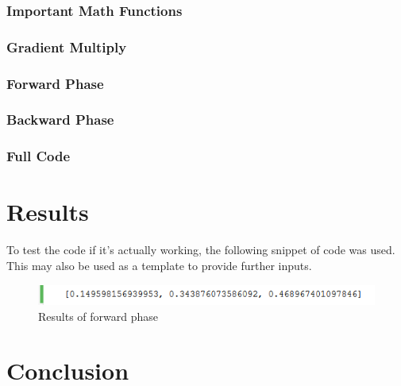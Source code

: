 \documentclass[a4paper, 11pt, english]{article}
\begin{document}
\subsubsection{Important Math Functions}

\subsubsection{Gradient Multiply} %

\subsubsection{Forward Phase}

\subsubsection{Backward Phase}

\subsubsection{Full Code}


\section{Results}
\par To test the code if it's actually working, the following snippet of code was used. This may also be used as a template to provide further inputs.

\begin{figure}[H]
  \centering
  \includegraphics[width=12cm]{images/result1.png}
  \caption{Results of forward phase} %
  \label{fig:result1}
\end{figure}

\section{Conclusion}

\newpage
\printbibliography
\end{document}
